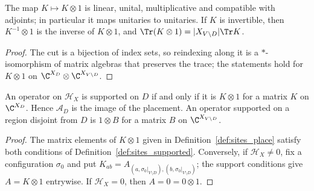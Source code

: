 \begin{lemma}
    \label{lem:sites_place_hom}
    \leanok
    The map $K\mapsto K\otimes1$ is linear, unital, multiplicative and
    compatible with adjoints; in particular it maps unitaries to unitaries. If $K$ is
    invertible, then $K^{-1}\otimes1$ is the inverse of $K\otimes1$, and $\Tr(K\otimes1)=|X_{V\setminus D}|\Tr K$.
\end{lemma}
\begin{proof}\leanok
    The cut is a bijection of index sets, so reindexing along it is a
    $*$-isomorphism of matrix algebras that preserves the trace; the
    statements hold for $K\otimes1$ on $\C^{X_D}\otimes\C^{X_{V\setminus D}}$.
\end{proof}

\begin{theorem}
    \label{thm:sites_place_range}
    \leanok
    An operator on $\mathcal H_X$ is supported on $D$ if and only if it is
    $K\otimes1$ for a matrix $K$ on $\C^{X_D}$. Hence $\mathcal A_D$ is the
    image of the placement. An operator supported on a region disjoint
    from $D$ is $1\otimes B$ for a matrix $B$ on $\C^{X_{V\setminus D}}$.
\end{theorem}
\begin{proof}\leanok
    The matrix elements of $K\otimes1$ given in
    Definition~\ref{def:sites_place} satisfy both conditions of
    Definition~\ref{def:sites_supported}. Conversely, if $\mathcal H_X\neq0$, fix a
    configuration $\sigma_0$ and put $K_{ab}=A_{(a,\sigma_0|_{V\setminus D}),
    (b,\sigma_0|_{V\setminus D})}$; the support conditions give
    $A=K\otimes1$ entrywise. If $\mathcal H_X=0$, then $A=0=0\otimes1$.
\end{proof}

